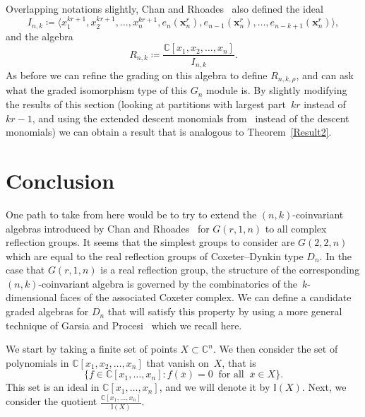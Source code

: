 \documentclass[ALCO,ThmDefs,Unicode,epreuves]{cedram}
\begin{document}
Overlapping notations slightly, Chan and Rhoades~\cite{CR} also defined the ideal
\begin{equation}
I_{n,k}\coloneqq \langle x_1^{kr+1},x_2^{kr+1},\ldots, x_n^{kr+1}, e_n(\mathbf{x}_n^r),e_{n-1}(\mathbf{x}_n^r),\ldots, 
e_{n-k+1}(\mathbf{x}_n^r)\rangle,
\end{equation}
and the algebra
\begin{equation}
R_{n,k}\coloneqq \frac{\mathbb{C}[x_1,x_2,\ldots, x_n]}{I_{n,k}}.
\end{equation} 
As before we can refine the grading on this algebra to define $R_{n,k,\rho}$, and can ask what the graded isomorphism type of 
this $G_n$ module is. By slightly modifying the results of this section (looking at partitions with largest part~$kr$ instead 
of $kr-1$, and using the extended descent monomials from~\cite{CR} instead of the descent monomials) we can obtain a result 
that is analogous to Theorem~\ref{Result2}.


\section{Conclusion}\label{Conclusion}

One path to take from here would be to try to extend the $(n,k)$-coinvariant algebras introduced by Chan and Rhoades~\cite{CR} 
for $G(r,1,n)$ to all complex reflection groups. It seems that the simplest groups to consider are $G(2,2,n)$ which are equal 
to the real reflection groups of Coxeter--Dynkin type $D_n$. In the case that $G(r,1,n)$ is a real reflection group, the 
structure of the corresponding $(n,k)$-coinvariant algebra is governed by the combinatorics of the~$k$-dimensional faces of 
the associated Coxeter complex. We can define a candidate graded algebras for $D_n$ that will satisfy this property by using a 
more general technique of Garsia and Procesi~\cite{GP} which we recall here.

We start by taking a finite set of points $X\subset \mathbb{C}^n$. We then consider the set of polynomials in 
$\mathbb{C}[x_1,x_2,\ldots, x_n]$ that vanish on~$X$, that is
\begin{equation}
\{f\in \mathbb{C}[x_1,\ldots, x_n]: 
f(\overline{x})=0 \ \text{ for all } \ \overline{x}\in X\}.
\end{equation}
 This set is an ideal in $\mathbb{C}[x_1,\ldots, 
x_n]$, and we will denote it by $\mathbb{I}(X)$. Next, we consider the quotient $\frac{\mathbb{C}[x_1,\ldots, 
x_n]}{\mathbb{I}(X)}$. 
\end{document}
